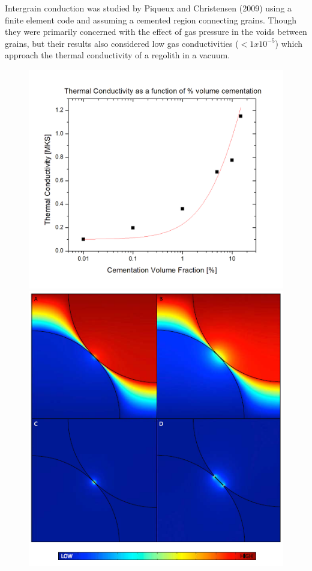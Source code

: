 \documentclass[11pt]{article} %
\begin{document}
\begin{itemize}
	 Intergrain conduction was studied by Piqueux and Christensen (2009) using a finite element code and assuming a cemented region connecting grains. Though they were primarily concerned with the effect of gas pressure in the voids between grains, but their results also considered low gas conductivities ($<1x10^{-5}$) which approach the thermal conductivity of a regolith in a vacuum.
	
	\begin{figure}
	\includegraphics[scale=0.5]{PandQ2009b_CemVolumeFraction.png}
	\includegraphics[scale=0.25]{PandQ2009b_Temp_grainimage.png}
	\end{figure}


\end{itemize}
\end{document}
